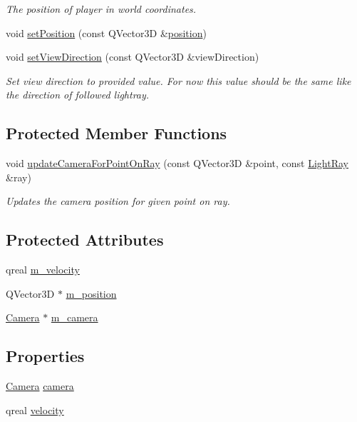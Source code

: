 \begin{DoxyCompactItemize}
\begin{DoxyCompactList}\small\item\em The position of player in world coordinates. \end{DoxyCompactList}\item 
void \hyperlink{class_player_a0cb33ddb87038b4e2af648e1b884d79f}{set\+Position} (const Q\+Vector3\+D \&\hyperlink{class_player_a0c307c67d3c6d64ee9c5b724c1e2b095}{position})
\item 
void \hyperlink{class_player_ae51ad40372e26d33351c02d77a1aba63}{set\+View\+Direction} (const Q\+Vector3\+D \&view\+Direction)
\begin{DoxyCompactList}\small\item\em Set view direction to provided value. For now this value should be the same like the direction of followed lightray. \end{DoxyCompactList}\end{DoxyCompactItemize}
\subsection*{Protected Member Functions}
\begin{DoxyCompactItemize}
\item 
void \hyperlink{class_player_a557b70acbd3cb1f71218390f7e90105c}{update\+Camera\+For\+Point\+On\+Ray} (const Q\+Vector3\+D \&point, const \hyperlink{class_light_ray}{Light\+Ray} \&ray)
\begin{DoxyCompactList}\small\item\em Updates the camera position for given point on ray. \end{DoxyCompactList}\end{DoxyCompactItemize}
\subsection*{Protected Attributes}
\begin{DoxyCompactItemize}
\item 
qreal \hyperlink{class_player_a962e97e5fd3fe1c2db4e7e2066dbe61c}{m\+\_\+velocity}
\item 
Q\+Vector3\+D $\ast$ \hyperlink{class_player_a9dc251e6a6d9a7f49c3f2ad5b64a7780}{m\+\_\+position}
\item 
\hyperlink{class_camera}{Camera} $\ast$ \hyperlink{class_player_a7721626a1c43592bfcb0c81a836f7aad}{m\+\_\+camera}
\end{DoxyCompactItemize}
\subsection*{Properties}
\begin{DoxyCompactItemize}
\item 
\hyperlink{class_camera}{Camera} \hyperlink{class_player_a4e1ae30bdaec837b94451416a523d5cb}{camera}
\item 
qreal \hyperlink{class_player_a53141a3791c456938945973cc78a2ea7}{velocity}
\end{DoxyCompactItemize}



